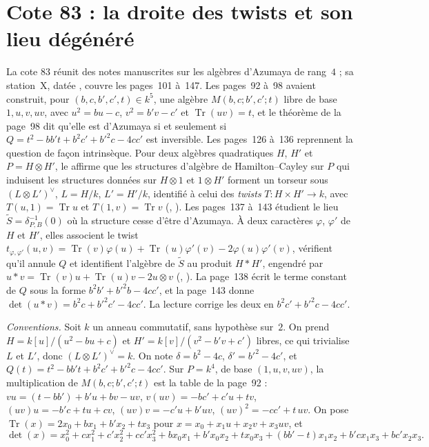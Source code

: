 \section[Cote 83 : la droite des twists et son lieu dégénéré]{Cote 83 : la droite des twists et son lieu dégénéré\protect{}}\label{sec:83}

La cote 83 réunit des notes manuscrites sur les algèbres d'Azumaya de rang~$4$ ; sa station~X, datée , couvre les pages~101 à~147. Les pages~92 à~98 avaient construit, pour $(b, c, b', c', t) \in k^5$, une algèbre $M(b, c; b', c'; t)$ libre de base $1, u, v, uv$, avec $u^2 = bu - c$, $v^2 = b'v - c'$ et $\operatorname{Tr}(uv) = t$, et le théorème de la page~98 dit qu'elle est d'Azumaya si et seulement si $Q = t^2 - bb't + b^2c' + b'^2c - 4cc'$ est inversible. Les pages~126 à~136 reprennent la question de façon intrinsèque. Pour deux algèbres quadratiques $H$, $H'$ et $P = H \otimes H'$, le  affirme que les structures d'algèbre de Hamilton--Cayley sur $P$ qui induisent les structures données sur $H \otimes 1$ et $1 \otimes H'$ forment un torseur sous $(L \otimes L')^{\vee}$, $L = H/k$, $L' = H'/k$, identifié à celui des \emph{twists} $T : H \times H' \to k$, avec $T(u, 1) = \operatorname{Tr}u$ et $T(1, v) = \operatorname{Tr}v$ (, ). Les pages~137 à~143 étudient le lieu $\widetilde S = \delta_{P,B}^{-1}(0)$ où la structure cesse d'être d'Azumaya. À deux caractères $\varphi$, $\varphi'$ de $H$ et $H'$, elles associent le twist $t_{\varphi,\varphi'}(u, v) = \operatorname{Tr}(v)\varphi(u) + \operatorname{Tr}(u)\varphi'(v) - 2\varphi(u)\varphi'(v)$, vérifient qu'il annule $Q$ et identifient l'algèbre de $\widetilde S$ au produit $H * H'$, engendré par $u * v = \operatorname{Tr}(v)u + \operatorname{Tr}(u)v - 2u \otimes v$ (, ). La page~138 écrit le terme constant de $Q$ sous la forme $b^2b' + b'^2b - 4cc'$, et la page~143 donne $\det(u * v) = b^2c + b'^2c' - 4cc'$. La lecture corrige les deux en $b^2c' + b'^2c - 4cc'$.

\noindent\emph{Conventions.} Soit $k$ un anneau commutatif, sans hypothèse sur~$2$. On prend $H = k[u]/(u^2 - bu + c)$ et $H' = k[v]/(v^2 - b'v + c')$ libres, ce qui trivialise $L$ et $L'$, donc $(L \otimes L')^{\vee} = k$. On note $\delta = b^2 - 4c$, $\delta' = b'^2 - 4c'$, et $Q(t) = t^2 - bb't + b^2c' + b'^2c - 4cc'$. Sur $P = k^4$, de base $(1, u, v, uv)$, la multiplication de $M(b, c; b', c'; t)$ est la table de la page~92 : $vu = (t - bb') + b'u + bv - uv$, $v(uv) = -bc' + c'u + tv$, $(uv)u = -b'c + tu + cv$, $(uv)v = -c'u + b'uv$, $(uv)^2 = -cc' + t\,uv$. On pose $\operatorname{Tr}(x) = 2x_0 + bx_1 + b'x_2 + tx_3$ pour $x = x_0 + x_1u + x_2v + x_3uv$, et
\[ \det(x) = x_0^2 + cx_1^2 + c'x_2^2 + cc'x_3^2 + bx_0x_1 + b'x_0x_2 + tx_0x_3 + (bb' - t)x_1x_2 + b'cx_1x_3 + bc'x_2x_3. \]

